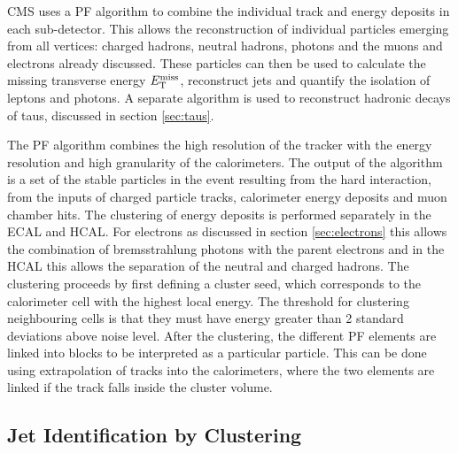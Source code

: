 CMS uses a \ac{PF} \cite{CMS-PAS-PFT-09-001,CMS-PAS-PFT-10-001,CMS-PAS-PFT-10-002} 
algorithm to combine the individual track and energy deposits in each sub-detector. 
This allows the reconstruction of individual particles emerging from all vertices: charged
hadrons, neutral hadrons, photons and the muons and electrons already discussed.
These particles can then be 
used to calculate the missing transverse energy $E_{\mathrm{T}}^{\text{miss}}$,
reconstruct jets and quantify the isolation of leptons and photons. A separate
algorithm is used to reconstruct hadronic decays of taus, discussed in section
\ref{sec:taus}. 

The \ac{PF} algorithm combines the high resolution of
the tracker with the energy resolution and high granularity of the calorimeters.
The output of the algorithm is a set of the stable particles in the event
resulting from the hard interaction, from the inputs of charged particle tracks,
calorimeter energy deposits and muon chamber hits. The clustering of energy
deposits is performed separately in the \ac{ECAL} and \ac{HCAL}. For electrons
as discussed in section \ref{sec:electrons} this allows the combination of
bremsstrahlung photons with the parent electrons and in the \ac{HCAL} this
allows the separation of the neutral and charged hadrons. The clustering
proceeds by first defining a cluster seed, which corresponds to the calorimeter
cell with the highest local energy. The threshold for clustering neighbouring
cells is that they must have energy greater than 2 standard deviations above
noise level. After the clustering, the different \ac{PF} elements are linked into
blocks to be interpreted as a particular particle. This can be done using
extrapolation of tracks into the calorimeters, where the two elements are linked
if the track falls inside the cluster volume.

\subsection{Jet Identification by Clustering}
\label{sec:jetID}

